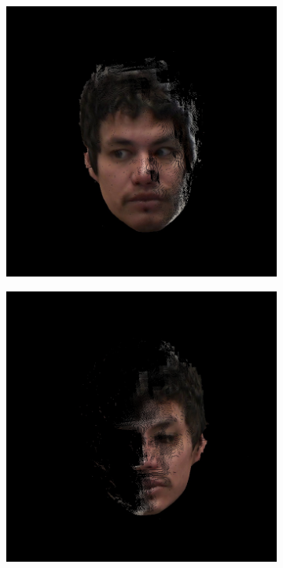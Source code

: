 \documentclass{ut-thesis}
\begin{document}
\begin{figure}[h]
\begin{subfigure}[b]{0.24\textwidth}
	\end{subfigure}
	\begin{subfigure}[b]{0.24\textwidth}
		\includegraphics[width=1.1\linewidth]{./img/eyeimages/f2.jpg}
	\end{subfigure}
	\begin{subfigure}[b]{0.24\textwidth}
		\includegraphics[width=1.1\linewidth]{./img/eyeimages/f3.jpg}

\end{subfigure}
\end{figure}
\end{document}
